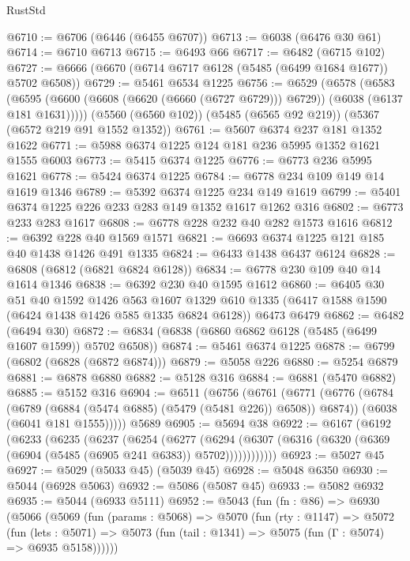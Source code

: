 \begin{lexlean}{RustStd}
\begin{coremodule}
@6710 := @6706 (@6446 (@6455 @6707))
@6713 := @6038 (@6476 @30 @61)
@6714 := @6710 @6713
@6715 := @6493 @66
@6717 := @6482 (@6715 @102)
@6727 := @6666 (@6670 (@6714 @6717 @6128 (@5485 (@6499 @1684 @1677)) @5702 @6508))
@6729 := @5461 @6534 @1225
@6756 := @6529
    (@6578
      (@6583
        (@6595 (@6600 (@6608 (@6620 (@6660 (@6727 @6729))) @6729)) (@6038 (@6137 @181 @1631)))))
    (@5560 (@6560 @102))
    (@5485 (@6565 @92 @219))
    (@5367 (@6572 @219 @91 @1552 @1352))
@6761 := @5607 @6374 @237 @181 @1352 @1622
@6771 := @5988 @6374 @1225 @124 @181 @236 @5995 @1352 @1621 @1555 @6003
@6773 := @5415 @6374 @1225
@6776 := @6773 @236 @5995 @1621
@6778 := @5424 @6374 @1225
@6784 := @6778 @234 @109 @149 @14 @1619 @1346
@6789 := @5392 @6374 @1225 @234 @149 @1619
@6799 := @5401 @6374 @1225 @226 @233 @283 @149 @1352 @1617 @1262 @316
@6802 := @6773 @233 @283 @1617
@6808 := @6778 @228 @232 @40 @282 @1573 @1616
@6812 := @6392 @228 @40 @1569 @1571
@6821 := @6693 @6374 @1225 @121 @185 @40 @1438 @1426 @491 @1335
@6824 := @6433 @1438 @6437 @6124
@6828 := @6808 (@6812 (@6821 @6824 @6128))
@6834 := @6778 @230 @109 @40 @14 @1614 @1346
@6838 := @6392 @230 @40 @1595 @1612
@6860 := @6405
    @30
    @51
    @40
    @1592
    @1426
    @563
    @1607
    @1329
    @610
    @1335
    (@6417 @1588 @1590 (@6424 @1438 @1426 @585 @1335 @6824 @6128))
    @6473
    @6479
@6862 := @6482 (@6494 @30)
@6872 := @6834 (@6838 (@6860 @6862 @6128 (@5485 (@6499 @1607 @1599)) @5702 @6508))
@6874 := @5461 @6374 @1225
@6878 := @6799 (@6802 (@6828 (@6872 @6874)))
@6879 := @5058 @226
@6880 := @5254 @6879
@6881 := @6878 @6880
@6882 := @5128 @316
@6884 := @6881 (@5470 @6882)
@6885 := @5152 @316
@6904 := @6511
    (@6756
      (@6761
        (@6771
          (@6776 (@6784 (@6789 (@6884 (@5474 @6885) (@5479 (@5481 @226)) @6508)) @6874))
          (@6038 (@6041 @181 @1555)))))
    @5689
@6905 := @5694 @38
@6922 := @6167
    (@6192
      (@6233
        (@6235
          (@6237
            (@6254
              (@6277
                (@6294
                  (@6307 (@6316 (@6320 (@6369 (@6904 (@5485 (@6905 @241 @6383)) @5702))))))))))))
@6923 := @5027 @45
@6927 := @5029 (@5033 @45) (@5039 @45)
@6928 := @5048 @6350
@6930 := @5044 (@6928 @5063)
@6932 := @5086 (@5087 @45)
@6933 := @5082 @6932
@6935 := @5044 (@6933 @5111)
@6952 := @5043
    (fun (fn : @86) =>
    @6930
      (@5066
        (@5069
          (fun (params : @5068) =>
          @5070
            (fun (rty : @1147) =>
            @5072
              (fun (lets : @5071) =>
              @5073 (fun (tail : @1341) => @5075 (fun (Γ : @5074) => @6935 @5158))))))

\end{coremodule}
\end{lexlean}
